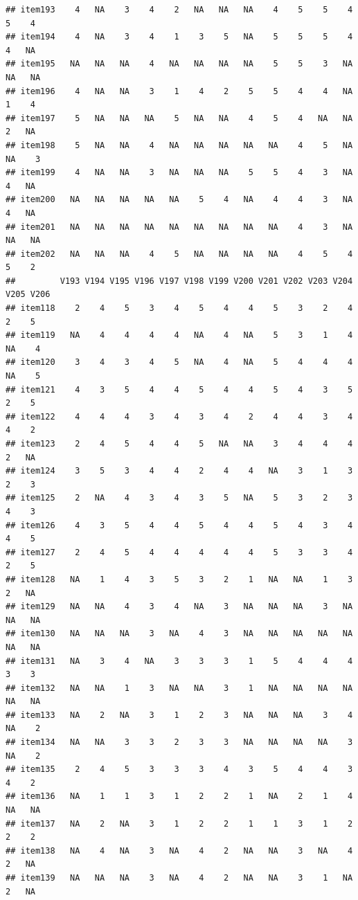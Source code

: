 \documentclass[
  man]{apa6}
\begin{document}
\begin{verbatim}
## item193    4   NA    3    4    2   NA   NA   NA    4    5    5    4    5    4
## item194    4   NA    3    4    1    3    5   NA    5    5    5    4    4   NA
## item195   NA   NA   NA    4   NA   NA   NA   NA    5    5    3   NA   NA   NA
## item196    4   NA   NA    3    1    4    2    5    5    4    4   NA    1    4
## item197    5   NA   NA   NA    5   NA   NA    4    5    4   NA   NA    2   NA
## item198    5   NA   NA    4   NA   NA   NA   NA   NA    4    5   NA   NA    3
## item199    4   NA   NA    3   NA   NA   NA    5    5    4    3   NA    4   NA
## item200   NA   NA   NA   NA   NA    5    4   NA    4    4    3   NA    4   NA
## item201   NA   NA   NA   NA   NA   NA   NA   NA   NA    4    3   NA   NA   NA
## item202   NA   NA   NA    4    5   NA   NA   NA   NA    4    5    4    5    2
##         V193 V194 V195 V196 V197 V198 V199 V200 V201 V202 V203 V204 V205 V206
## item118    2    4    5    3    4    5    4    4    5    3    2    4    2    5
## item119   NA    4    4    4    4   NA    4   NA    5    3    1    4   NA    4
## item120    3    4    3    4    5   NA    4   NA    5    4    4    4   NA    5
## item121    4    3    5    4    4    5    4    4    5    4    3    5    2    5
## item122    4    4    4    3    4    3    4    2    4    4    3    4    4    2
## item123    2    4    5    4    4    5   NA   NA    3    4    4    4    2   NA
## item124    3    5    3    4    4    2    4    4   NA    3    1    3    2    3
## item125    2   NA    4    3    4    3    5   NA    5    3    2    3    4    3
## item126    4    3    5    4    4    5    4    4    5    4    3    4    4    5
## item127    2    4    5    4    4    4    4    4    5    3    3    4    2    5
## item128   NA    1    4    3    5    3    2    1   NA   NA    1    3    2   NA
## item129   NA   NA    4    3    4   NA    3   NA   NA   NA    3   NA   NA   NA
## item130   NA   NA   NA    3   NA    4    3   NA   NA   NA   NA   NA   NA   NA
## item131   NA    3    4   NA    3    3    3    1    5    4    4    4    3    3
## item132   NA   NA    1    3   NA   NA    3    1   NA   NA   NA   NA   NA   NA
## item133   NA    2   NA    3    1    2    3   NA   NA   NA    3    4   NA    2
## item134   NA   NA    3    3    2    3    3   NA   NA   NA   NA    3   NA    2
## item135    2    4    5    3    3    3    4    3    5    4    4    3    4    2
## item136   NA    1    1    3    1    2    2    1   NA    2    1    4   NA   NA
## item137   NA    2   NA    3    1    2    2    1    1    3    1    2    2    2
## item138   NA    4   NA    3   NA    4    2   NA   NA    3   NA    4    2   NA
## item139   NA   NA   NA    3   NA    4    2   NA   NA    3    1   NA    2   NA

\end{verbatim}
\end{document}
